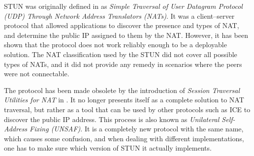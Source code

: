 STUN was originally defined in \cite{rfc3489} as \textit{Simple Traversal of User Datagram Protocol (UDP) Through Network Address Translators (NATs)}. It was a client–server protocol that allowed applications to discover the presence and types of NAT, and determine the public IP assigned to them by the NAT. However, it has been shown that the protocol does not work reliably enough to be a deployable solution. The NAT classification used by the STUN did not cover all possible types of NATs, and it did not provide any remedy in scenarios where the peers were not connectable.


The protocol has been made obsolete by the introduction of \textit{Session Traversal Utilities for NAT} in \cite{rfc5389}. It no longer presents itself as a complete solution to NAT traversal, but rather as a tool that can be used by other protocols such as ICE to discover the public IP address. This process is also known as \textit{Unilateral Self-Address Fixing (UNSAF)}. It is a completely new protocol with the same name, which causes some confusion, and when dealing with different implementations, one has to make sure which version of STUN it actually implements.

